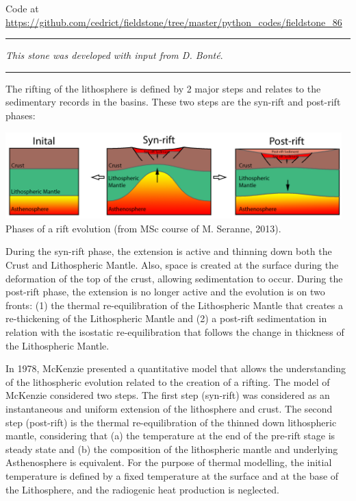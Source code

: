 \begin{center}
Code at \url{https://github.com/cedrict/fieldstone/tree/master/python_codes/fieldstone_86}
\end{center}

\par\noindent\rule{\textwidth}{0.4pt}

{\sl This stone was developed with input from D. Bont{\'e}}. 

\par\noindent\rule{\textwidth}{0.4pt}

The rifting of the lithosphere is defined by 2 major steps and relates to 
the sedimentary records in the basins. These two steps are the syn-rift 
and post-rift phases:

\begin{center}
\includegraphics[width=13cm]{python_codes/fieldstone_86/images/synpost}\\
{\captionfont Phases of a rift evolution (from MSc course of M. Seranne, 2013).} 
\end{center}

During the syn-rift phase, the extension is active and thinning down both the 
Crust and Lithospheric Mantle. Also, space is created at the surface during the deformation 
of the top of the crust, allowing sedimentation to occur. During the post-rift phase, 
the extension is no longer active and the evolution is on two fronts: 
(1) the thermal re-equilibration of the Lithospheric Mantle that creates a re-thickening 
of the Lithospheric Mantle and 
(2) a post-rift sedimentation in relation with the isostatic re-equilibration that 
follows the change in thickness of the Lithospheric Mantle.

In 1978, McKenzie presented a quantitative model \cite{mcke78} 
that allows the understanding of the lithospheric evolution related to the creation of a rifting. The model of McKenzie considered two steps. The first step (syn-rift) was considered as an instantaneous and uniform extension of the lithosphere and crust. The second step (post-rift)  is the thermal re-equilibration of the thinned down lithospheric mantle, considering that (a) the temperature at the end of the pre-rift stage is steady state and (b) the composition of the lithospheric mantle and underlying Asthenosphere is equivalent. For the purpose of thermal modelling, the initial temperature is defined by a fixed temperature at the surface and at the base of the Lithosphere, and the radiogenic heat production is neglected.

